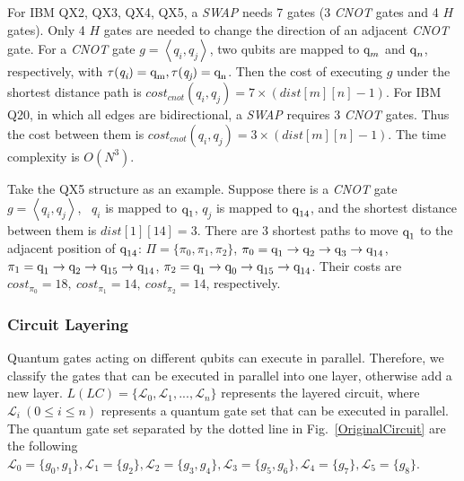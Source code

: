 \documentclass[runningheads]{llncs}
\begin{document}
For IBM QX2, QX3, QX4, QX5, a \textit{SWAP} needs 7 gates (3 \textit{CNOT} gates and 4 $H$ gates). Only 4 $H$ gates are needed to change the direction of an adjacent \textit{CNOT} gate. 
For a \textit{CNOT} gate $g=\left \langle  \textit{q}_\textit{i},\textit{q}_\textit{j} \right \rangle $,
two qubits are mapped to $\textup{q}_{m}$ and $\textup{q}_{n}$, respectively, with $\tau(\textit{q}_\textit{i})=\textup{q}_{\textup{m}},\tau(\textit{q}_\textit{j})=\textup{q}_{\textup{n}}$. Then the cost of executing $g$ under the shortest distance path is $cost_{cnot}(\textit{q}_\textit{i},\textit{q}_\textit{j})=7 \times( dist[m][n]-1)$. For IBM Q20, in which all edges are bidirectional, a \textit{SWAP} requires 3 \textit{CNOT} gates. Thus the cost between them is $cost_{cnot}(\textit{q}_\textit{i},\textit{q}_\textit{j})=3 \times( dist[m][n]-1)$. The time complexity is $O (N^{3})$.
\begin{example}
	Take the QX5 structure as an example. Suppose there is a \textit{CNOT} gate $g=\left \langle  \textit{q}_\textit{i}, \textit{q}_\textit{j} \right \rangle $, \ $\textit{q}_\textit{i}$ is mapped to $\textup{q}_{1}$,  $\textit{q}_\textit{j}$ is mapped to $\textup{q}_{\textup{14}}$, and the shortest distance between them  is $dist[1][14]=3$. There are 3 shortest paths to move $\textup{q}_{\textup{1}}$ to the adjacent position of 
$\textup{q}_{\textup{14}}$:
$\Pi=\{\pi_{0},\pi_{1},\pi_{2}\}$, 
$\pi_{0}={\textup{q}_{\textup{1}}\rightarrow \textup{q}_{\textup{2}} \rightarrow \textup{q}_{\textup{3}} \rightarrow \textup{q}_{\textup{14}}}$,
$\pi_{1}={\textup{q}_{\textup{1}}\rightarrow \textup{q}_{\textup{2}} \rightarrow \textup{q}_{\textup{15}} \rightarrow \textup{q}_{\textup{14}}}$,
$\pi_{2}={\textup{q}_{\textup{1}}\rightarrow \textup{q}_{\textup{0}} \rightarrow \textup{q}_{\textup{15}} \rightarrow \textup{q}_{\textup{14}}}$.
Their costs are 
$cost_{\pi_{0}}=18,\ cost_{\pi_{1}}=14,\ cost_{\pi_{2}}=14$, respectively.
\end{example}

\subsubsection{Circuit Layering}
Quantum gates acting on different qubits can execute in parallel. Therefore, we classify the gates that can be executed in parallel into one layer, otherwise add a new layer. $L(LC)=\{\mathcal{L}_{0},\mathcal{L}_{1},...,\mathcal{L}_{n}\}$ represents the layered circuit, where $\mathcal{L}_{i} \ (0 \le i \le n) $ represents a quantum gate set that can be executed in parallel. The quantum gate set separated by the dotted line in Fig.~\ref{OriginalCircuit} are the following $\mathcal{L}_{0}=\{g_{0},g_{1}\},\mathcal{L}_{1}=\{g_{2}\},
 \mathcal{L}_{2}=\{g_{3},g_{4}\},\mathcal{L}_{3}=\{g_{5},g_{6}\},\mathcal{L}_{4}=\{g_{7}\},\mathcal{L}_{5}=\{g_{8}\}$.
\end{document}
